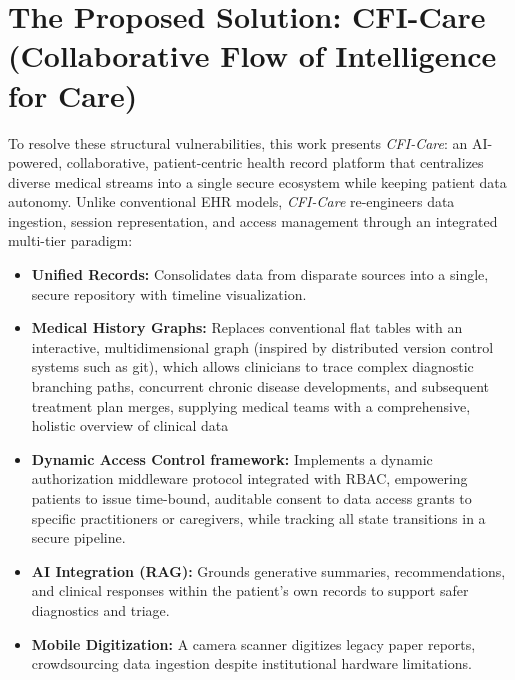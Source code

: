 \section{The Proposed Solution: CFI-Care (Collaborative Flow of Intelligence for Care)}
\hspace*{2em}To resolve these structural vulnerabilities, 
this work presents \textit{CFI-Care}: an AI-powered, collaborative, patient-centric health record platform 
that centralizes diverse medical streams into a single secure ecosystem while keeping patient data autonomy.
Unlike conventional EHR models, \textit{CFI-Care} re-engineers data ingestion, 
session representation, and access management through an integrated multi-tier paradigm:
\begin{itemize}
      \item \textbf{Unified Records:} Consolidates data from disparate sources into a single, 
      secure repository with timeline visualization.
      \item \textbf{Medical History Graphs:} Replaces conventional flat tables with an interactive, 
      multidimensional graph (inspired by distributed version control systems such as git), 
      which allows clinicians to trace complex diagnostic branching paths, 
      concurrent chronic disease developments, and subsequent treatment plan merges, 
      supplying medical teams with a comprehensive, holistic overview of clinical data  %
      \item \textbf{Dynamic Access Control framework:} Implements a dynamic authorization middleware protocol integrated with \ac{RBAC}, 
      empowering patients to issue time-bound, auditable consent to data access grants to specific practitioners or caregivers, while tracking all state transitions in a secure pipeline.
      \item \textbf{AI Integration (RAG):} Grounds generative summaries, recommendations, and clinical responses within the patient's own records to support safer diagnostics and triage.
      \item \textbf{Mobile Digitization:} A camera scanner digitizes legacy paper reports, crowdsourcing data ingestion despite institutional hardware limitations.
\end{itemize}

